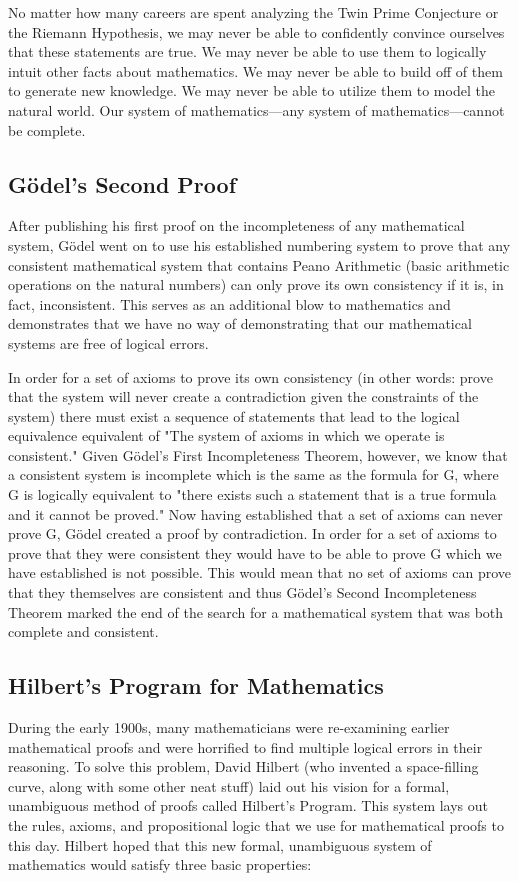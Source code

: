 \documentclass[conference]{IEEEtran}
\begin{document}
No matter how many careers are spent analyzing the Twin Prime Conjecture or the Riemann Hypothesis, we may never be able to confidently convince ourselves that these statements are true. We may never be able to use them to logically intuit other facts about mathematics. We may never be able to build off of them to generate new knowledge. We may never be able to utilize them to model the natural world. Our system of mathematics—any system of mathematics—cannot be complete. 

\subsection{Gödel's Second Proof}
After publishing his first proof on the incompleteness of any mathematical system, Gödel went on to use his established numbering system to prove that any consistent mathematical system that contains Peano Arithmetic (basic arithmetic operations on the natural numbers) can only prove its own consistency if it is, in fact, inconsistent. This serves as an additional blow to mathematics and demonstrates that we have no way of demonstrating that our mathematical systems are free of logical errors. 

In order for a set of axioms to prove its own consistency (in other words: prove that the system will never create a contradiction given the constraints of the system) there must exist a sequence of statements that lead to the logical equivalence equivalent of "The system of axioms in which we operate is consistent." Given Gödel's First Incompleteness Theorem, however, we know that a consistent system is incomplete which is the same as the formula for G, where G is logically equivalent to "there exists such a statement that is a true formula and it cannot be proved." Now having established that a set of axioms can never prove G, Gödel created a proof by contradiction. In order for a set of axioms to prove that they were consistent they would have to be able to prove G which we have established is not possible.  This would mean that no set of axioms can prove that they themselves are consistent and thus Gödel's Second Incompleteness Theorem marked the end of the search for a mathematical system that was both complete and consistent. 
\bigskip

\subsection{Hilbert's Program for Mathematics} 
During the early 1900s, many mathematicians were re-examining earlier mathematical proofs and were horrified to find multiple logical errors in their reasoning. To solve this problem, David Hilbert (who invented a space-filling curve, along with some other neat stuff) laid out his vision for a formal, unambiguous method of proofs called Hilbert's Program. This system lays out the rules, axioms, and propositional logic that we use for mathematical proofs to this day. Hilbert hoped that this new formal, unambiguous system of mathematics would satisfy three basic properties: 
\end{document}
